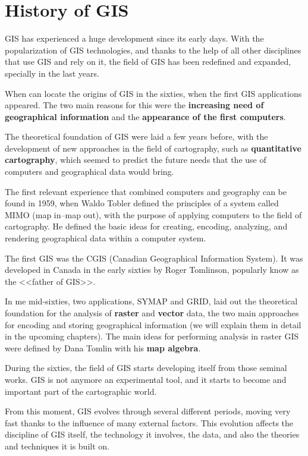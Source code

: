 
\chapter{History of GIS}


\pagestyle{fancy}

GIS has experienced a huge development since its early days. With the popularization of GIS technologies, and thanks to the help of all other disciplines that use GIS and rely on it, the field of GIS has been redefined and expanded, specially in the last years.

When can locate the origins of GIS in the sixties, when the first GIS applications appeared. The two main reasons for this were the \textbf{increasing need of geographical information} and the \textbf{appearance of the first computers}.

The theoretical foundation of GIS were laid a few years before, with the development of new approaches in the field of cartography, such as \textbf{quantitative cartography}, which seemed to predict the future needs that the use of computers and geographical data would bring.

The first relevant experience that combined computers and geography can be found in 1959, when Waldo Tobler defined the principles of a system called MIMO (map in--map out), with the purpose of applying computers to the field of cartography. He defined the basic ideas for creating, encoding, analyzing, and rendering geographical data within a computer system.

The first GIS was the CGIS (Canadian Geographical Information System). It was developed in Canada in the early sixties by Roger Tomlinson, popularly know as the <<father of GIS>>.

In me mid-sixties, two applications, SYMAP and GRID, laid out the theoretical foundation for the analysis of \textbf{raster} and \textbf{vector} data, the two main approaches for encoding and storing geographical information (we will explain them in detail in the upcoming chapters). The main ideas for performing analysis in raster GIS were defined by Dana Tomlin with his \textbf{map algebra}.

During the sixties, the field of GIS starts developing itself from those seminal works. GIS is not anymore an experimental tool, and it starts to become and important part of the cartographic world.

From this moment, GIS evolves through several different periods, moving very fast thanks to the influence of many external factors. This evolution affects the discipline of GIS itself, the technology it involves, the data, and also the theories and techniques it is built on.



